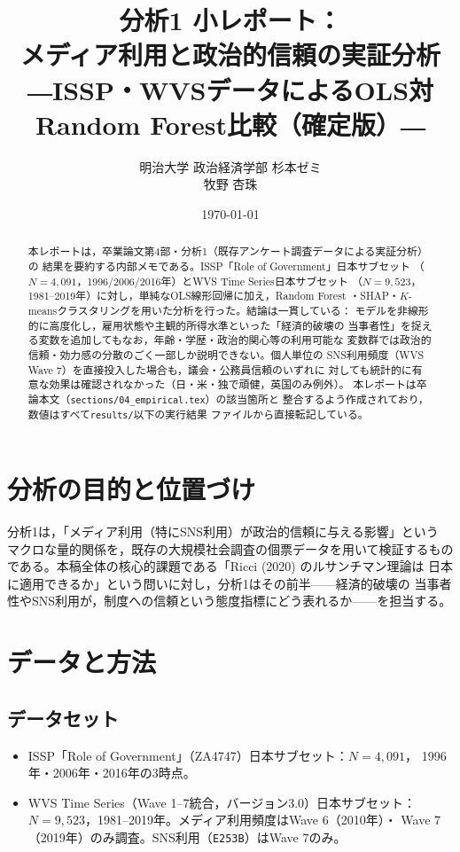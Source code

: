 \documentclass[dvipdfmx, a4paper, 11pt]{jsarticle}
\title{分析1 小レポート：\\メディア利用と政治的信頼の実証分析\\ \large{―ISSP・WVSデータによるOLS対Random Forest比較（確定版）―}}
\author{明治大学 政治経済学部 杉本ゼミ\\ 牧野 杏珠}
\date{\today}
\begin{document}
\maketitle

\begin{abstract}
本レポートは，卒業論文第4部・分析1（既存アンケート調査データによる実証分析）の
結果を要約する内部メモである。ISSP「Role of Government」日本サブセット
（$N=4{,}091$，1996/2006/2016年）とWVS Time Series日本サブセット
（$N=9{,}523$，1981--2019年）に対し，単純なOLS線形回帰に加え，Random Forest
・SHAP・$K$-meansクラスタリングを用いた分析を行った。結論は一貫している：
モデルを非線形的に高度化し，雇用状態や主観的所得水準といった「経済的破壊の
当事者性」を捉える変数を追加してもなお，年齢・学歴・政治的関心等の利用可能な
変数群では政治的信頼・効力感の分散のごく一部しか説明できない。個人単位の
SNS利用頻度（WVS Wave 7）を直接投入した場合も，議会・公務員信頼のいずれに
対しても統計的に有意な効果は確認されなかった（日・米・独で頑健，英国のみ例外）。
本レポートは卒論本文（\texttt{sections/04\_empirical.tex}）の該当箇所と
整合するよう作成されており，数値はすべて\texttt{results/}以下の実行結果
ファイルから直接転記している。
\end{abstract}

\section{分析の目的と位置づけ}
分析1は，「メディア利用（特にSNS利用）が政治的信頼に与える影響」という
マクロな量的関係を，既存の大規模社会調査の個票データを用いて検証するもの
である。本稿全体の核心的課題である「Ricci (2020) のルサンチマン理論は
日本に適用できるか」という問いに対し，分析1はその前半——経済的破壊の
当事者性やSNS利用が，制度への信頼という態度指標にどう表れるか——を担当する。

\section{データと方法}

\subsection{データセット}
\begin{itemize}
  \item ISSP「Role of Government」（ZA4747）日本サブセット：$N=4{,}091$，
    1996年・2006年・2016年の3時点。
  \item WVS Time Series（Wave 1--7統合，バージョン3.0）日本サブセット：
    $N=9{,}523$，1981--2019年。メディア利用頻度はWave 6（2010年）・
    Wave 7（2019年）のみ調査。SNS利用（\texttt{E253B}）はWave 7のみ。
\end{itemize}
\end{document}
